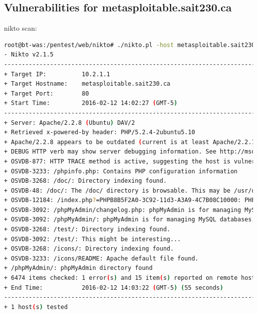\documentclass{article}
\begin{document}
\newpage
\subsection{Vulnerabilities for metasploitable.sait230.ca}

nikto scan:

\begin{lstlisting}[language=Bash]
root@bt-was:/pentest/web/nikto# ./nikto.pl -host metasploitable.sait230.ca -p 80
- Nikto v2.1.5
---------------------------------------------------------------------------
+ Target IP:          10.2.1.1
+ Target Hostname:    metasploitable.sait230.ca
+ Target Port:        80
+ Start Time:         2016-02-12 14:02:27 (GMT-5)
---------------------------------------------------------------------------
+ Server: Apache/2.2.8 (Ubuntu) DAV/2
+ Retrieved x-powered-by header: PHP/5.2.4-2ubuntu5.10
+ Apache/2.2.8 appears to be outdated (current is at least Apache/2.2.19). Apache 1.3.42 (final release) and 2.0.64 are also current.
+ DEBUG HTTP verb may show server debugging information. See http://msdn.microsoft.com/en-us/library/e8z01xdh%28VS.80%29.aspx for details.
+ OSVDB-877: HTTP TRACE method is active, suggesting the host is vulnerable to XST
+ OSVDB-3233: /phpinfo.php: Contains PHP configuration information
+ OSVDB-3268: /doc/: Directory indexing found.
+ OSVDB-48: /doc/: The /doc/ directory is browsable. This may be /usr/doc.
+ OSVDB-12184: /index.php?=PHPB8B5F2A0-3C92-11d3-A3A9-4C7B08C10000: PHP reveals potentially sensitive information via certain HTTP requests that contain specific QUERY strings.
+ OSVDB-3092: /phpMyAdmin/changelog.php: phpMyAdmin is for managing MySQL databases, and should be protected or limited to authorized hosts.
+ OSVDB-3092: /phpMyAdmin/: phpMyAdmin is for managing MySQL databases, and should be protected or limited to authorized hosts.
+ OSVDB-3268: /test/: Directory indexing found.
+ OSVDB-3092: /test/: This might be interesting...
+ OSVDB-3268: /icons/: Directory indexing found.
+ OSVDB-3233: /icons/README: Apache default file found.
+ /phpMyAdmin/: phpMyAdmin directory found
+ 6474 items checked: 1 error(s) and 15 item(s) reported on remote host
+ End Time:           2016-02-12 14:03:22 (GMT-5) (55 seconds)
---------------------------------------------------------------------------
+ 1 host(s) tested
\end{lstlisting}
\end{document}
